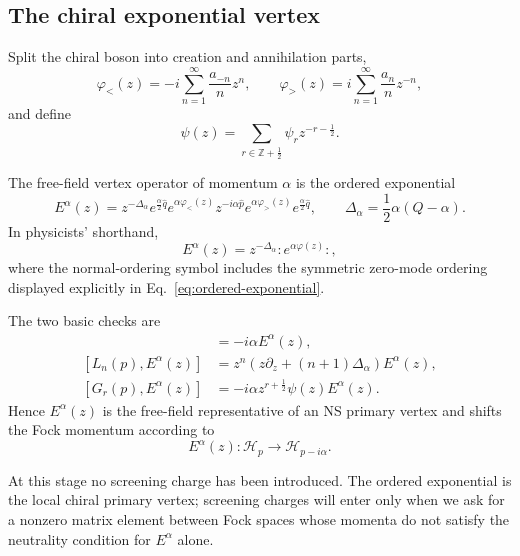 \documentclass[11pt]{article}
\newcommand{\cH}{\mathcal H}
\begin{document}
\subsection{The chiral exponential vertex}

Split the chiral boson into creation and annihilation parts,
\begin{equation}
 \varphi_{<}(z)
 =-i\sum_{n=1}^{\infty}\frac{a_{-n}}{n}z^n,
 \qquad
 \varphi_{>}(z)
 =i\sum_{n=1}^{\infty}\frac{a_n}{n}z^{-n},
 \label{eq:boson-splitting}
\end{equation}
and define
\begin{equation}
 \psi(z)
 =\sum_{r\in\mathbb Z+\frac12}\psi_r z^{-r-\frac12}.
 \label{eq:fermion-field}
\end{equation}

The free-field vertex operator of momentum \(\alpha\) is the ordered
exponential
\begin{equation}
 \boxed{
 E^{\alpha}(z)
 =z^{-\Delta_\alpha}
 e^{\frac{\alpha}{2}\widehat q}
 e^{\alpha\varphi_{<}(z)}
 z^{-i\alpha\widehat p}
 e^{\alpha\varphi_{>}(z)}
 e^{\frac{\alpha}{2}\widehat q}
 },
 \qquad
 \Delta_\alpha=\frac12\alpha(Q-\alpha).
 \label{eq:ordered-exponential}
\end{equation}
In physicists' shorthand,
\begin{equation}
 E^{\alpha}(z)
 =z^{-\Delta_\alpha}:e^{\alpha\varphi(z)}:,
 \label{eq:normal-ordered-shorthand}
\end{equation}
where the normal-ordering symbol includes the symmetric zero-mode ordering
displayed explicitly in Eq.~\eqref{eq:ordered-exponential}.

The two basic checks are
\begin{align}
 [\widehat p,E^{\alpha}(z)]
 &=-i\alpha E^{\alpha}(z),
 \label{eq:E-momentum-shift}
 \\
 [L_n(p),E^{\alpha}(z)]
 &=z^n\left(z\partial_z+(n+1)\Delta_\alpha\right)E^{\alpha}(z),
 \label{eq:E-Virasoro-primary}
 \\
 [G_r(p),E^{\alpha}(z)]
 &=-i\alpha z^{r+\frac12}\psi(z)E^{\alpha}(z).
 \label{eq:E-superpartner}
\end{align}
Hence \(E^{\alpha}(z)\) is the free-field representative of an NS primary
vertex and shifts the Fock momentum according to
\begin{equation}
 E^{\alpha}(z):\cH_p\longrightarrow\cH_{p-i\alpha}.
 \label{eq:E-map}
\end{equation}

At this stage no screening charge has been introduced.  The ordered
exponential is the local chiral primary vertex; screening charges will enter
only when we ask for a nonzero matrix element between Fock spaces whose
momenta do not satisfy the neutrality condition for \(E^{\alpha}\) alone.
\end{document}
